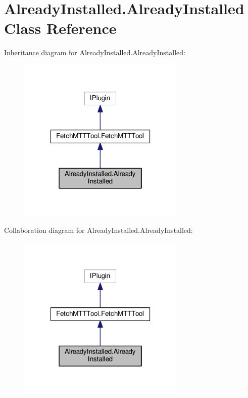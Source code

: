 \hypertarget{class_already_installed_1_1_already_installed}{\section{Already\-Installed.\-Already\-Installed Class Reference}
\label{class_already_installed_1_1_already_installed}
}


Inheritance diagram for Already\-Installed.\-Already\-Installed\-:
\nopagebreak
\begin{figure}[H]
\begin{center}
\leavevmode
\includegraphics[width=226pt]{class_already_installed_1_1_already_installed__inherit__graph}
\end{center}
\end{figure}


Collaboration diagram for Already\-Installed.\-Already\-Installed\-:
\nopagebreak
\begin{figure}[H]
\begin{center}
\leavevmode
\includegraphics[width=226pt]{class_already_installed_1_1_already_installed__coll__graph}
\end{center}
\end{figure}
